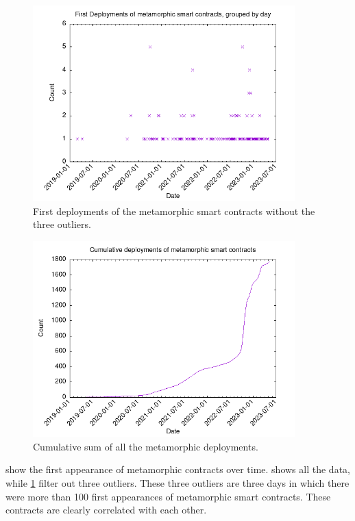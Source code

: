 \begin{figure}
    \centering
    \includegraphics[width=0.9\textwidth]{Figures/analysis/metamorphic-first_deploys_no_outliers.png}
    \caption{First deployments of the metamorphic smart contracts without the three outliers.}
    \label{fig:meta-deploys-2}
\end{figure}

\begin{figure}
    \centering
    \includegraphics[width=0.9\textwidth]{Figures/analysis/metamorphic-all_deployments.png}
    \caption{Cumulative sum of all the metamorphic deployments.}
    \label{fig:meta-deploys-all}
\end{figure}

 show the first appearance of metamorphic contracts over time.
 shows all the data, while \cref{fig:meta-deploys-2} filter out three outliers. These three outliers are three days in which there were more than 100 first appearances of metamorphic smart contracts. These contracts are clearly correlated with each other. 

